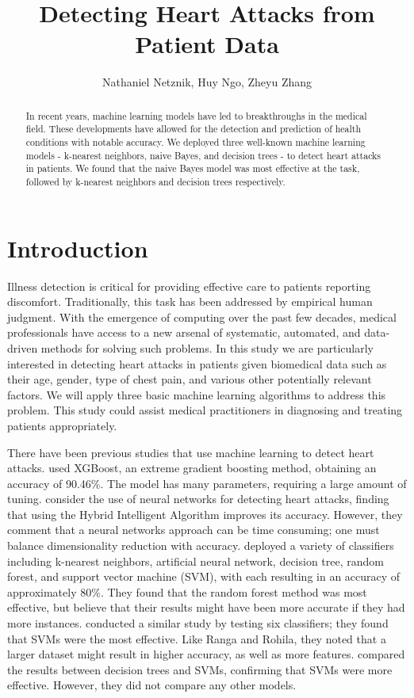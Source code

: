 \documentclass{article}
\title{Detecting Heart Attacks from Patient Data}
\author{Nathaniel Netznik, Huy Ngo, Zheyu Zhang}
\affil{CMPSC 445 - Applied Machine Learning in Data Science}
\date{}
\begin{document}
\maketitle
\begin{abstract}
In recent years, machine learning models have led to breakthroughs in the medical field. These developments have allowed for the detection and prediction of health conditions with notable accuracy. We deployed three well-known machine learning models - k-nearest neighbors, naive Bayes, and decision trees - to detect heart attacks in patients. We found that the naive Bayes model was most effective at the task, followed by k-nearest neighbors and decision trees respectively.
\end{abstract}
\section{Introduction}


Illness detection is critical for providing effective care to patients reporting discomfort. Traditionally, this task has been addressed by empirical human judgment. With the emergence of computing over the past few decades, medical professionals have access to a new arsenal of systematic, automated, and data-driven methods for solving such problems. In this study we are particularly interested in detecting heart attacks in patients given biomedical data such as their age, gender, type of chest pain, and various other potentially relevant factors. We will apply three basic machine learning algorithms to address this problem. This study could assist medical practitioners in diagnosing and treating patients appropriately.


There have been previous studies that use machine learning to detect heart attacks. \cite{karthikeyan} used XGBoost, an extreme gradient boosting method, obtaining an accuracy of 90.46\%. The model has many parameters, requiring a large amount of tuning. \cite{chitra} consider the use of neural networks for detecting heart attacks, finding that using the Hybrid Intelligent Algorithm improves its accuracy. However, they comment that a neural networks approach can be time consuming; one must balance dimensionality reduction with accuracy. \cite{ranga} deployed a variety of classifiers including k-nearest neighbors, artificial neural network, decision tree, random forest, and support vector machine (SVM), with each resulting in an accuracy of approximately 80\%. They found that the random forest method was most effective, but believe that their results might have been more accurate if they had more instances. \cite{ware} conducted a similar study by testing six classifiers; they found that SVMs were the most effective. Like Ranga and Rohila, they noted that a larger dataset might result in higher accuracy, as well as more features. \cite{gawale} compared the results  between decision trees and SVMs, confirming that SVMs were more effective. However, they did not compare any other models.
\end{document}
